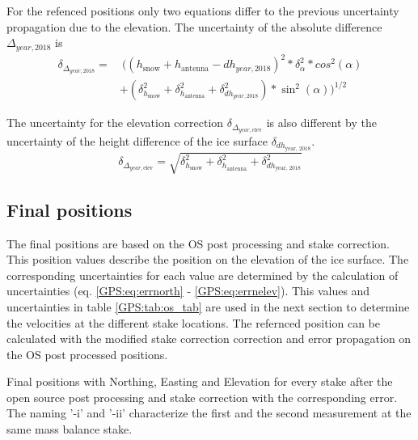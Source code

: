 For the refenced positions only two equations differ to the previous uncertainty propagation due to the elevation. 
The uncertainty of the absolute difference $\Delta_{year,2018}$ is
\begin{equation}
\begin{split}
\delta_{\Delta_{year,2018}} = & 
\ ((h_{\text{snow}} + h_{\text{antenna}} - dh_{year,2018})^2 * \delta_{\alpha}^2 * cos^2(\alpha)\\
&+ (\delta_{h_{\text{snow}}}^2 + \delta_{h_{\text{antenna}}}^2 + \delta_{dh_{year,2018}}^2) * \sin^2(\alpha))^{1/2}
\end{split}
\end{equation}

The uncertainty for the elevation correction $\delta_{\Delta_{year, \text{elev}}}$ is also different by the uncertainty of the height difference of the ice surface $\delta_{dh_{\text{year, 2018}}}$.
\begin{equation}
	\delta_{\Delta_{year, \text{elev}}} = \sqrt{\delta_{h_{\text{snow}}}^2 + \delta_{h_{\text{antenna}}}^2 + \delta_{dh_{\text{year, 2018}}}^2}
\end{equation}

\subsection{Final positions}

The final positions are based on the OS post processing and stake correction.
This position values describe the position on the elevation of the ice surface. 
The corresponding uncertainties for each value are determined by the calculation of uncertainties (eq. \ref{GPS:eq:errnorth} - \ref{GPS:eq:errnelev}). 
This values and uncertainties in table \ref{GPS:tab:os_tab} are used in the next section to determine the velocities at the different stake locations. 
The refernced position can be calculated with the modified stake correction correction and error propagation on the OS post processed positions. 

\begin{table}[H]
	\caption{Final positions with Northing, Easting and Elevation for every stake after the open source post processing and stake correction with the corresponding error. The naming '-i' and '-ii' characterize the first and the second measurement at the same mass balance stake.}
	\centering
	
	\label{GPS:tab:os_tab}
\end{table}
